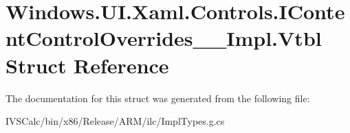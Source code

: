 \hypertarget{struct_windows_1_1_u_i_1_1_xaml_1_1_controls_1_1_i_content_control_overrides_____impl_1_1_vtbl}{}\section{Windows.\+U\+I.\+Xaml.\+Controls.\+I\+Content\+Control\+Overrides\+\_\+\+\_\+\+Impl.\+Vtbl Struct Reference}
\label{struct_windows_1_1_u_i_1_1_xaml_1_1_controls_1_1_i_content_control_overrides_____impl_1_1_vtbl}


The documentation for this struct was generated from the following file\+:\begin{DoxyCompactItemize}
\item 
I\+V\+S\+Calc/bin/x86/\+Release/\+A\+R\+M/ilc/Impl\+Types.\+g.\+cs\end{DoxyCompactItemize}

